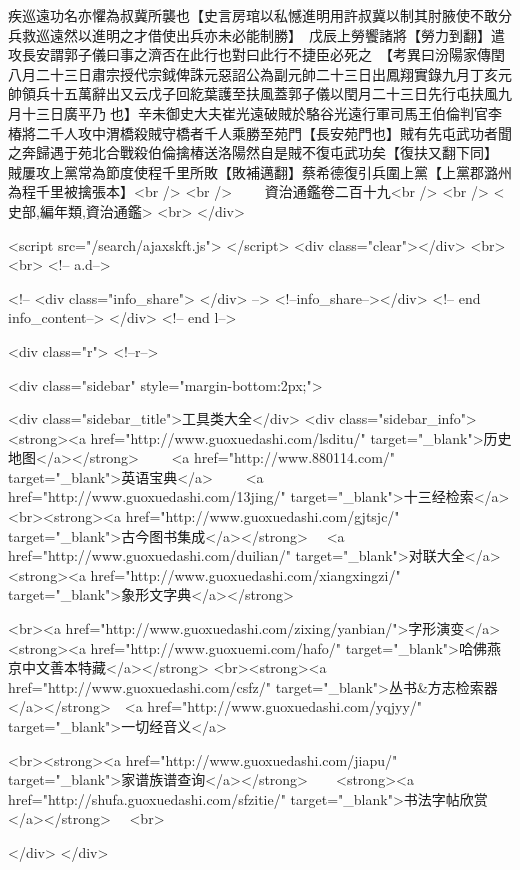疾巡遠功名亦懼為叔冀所襲也【史言房琯以私憾進明用許叔冀以制其肘腋使不敢分兵救巡遠然以進明之才借使出兵亦未必能制勝】　戊辰上勞饗諸將【勞力到翻】遣攻長安謂郭子儀曰事之濟否在此行也對曰此行不捷臣必死之　【考異曰汾陽家傳閏八月二十三日肅宗授代宗鉞俾誅元惡詔公為副元帥二十三日出鳳翔實錄九月丁亥元帥領兵十五萬辭出又云戊子回紇葉護至扶風蓋郭子儀以閏月二十三日先行屯扶風九月十三日廣平乃也】辛未御史大夫崔光遠破賊於駱谷光遠行軍司馬王伯倫判官李椿將二千人攻中渭橋殺賊守橋者千人乘勝至苑門【長安苑門也】賊有先屯武功者聞之奔歸遇于苑北合戰殺伯倫擒椿送洛陽然自是賊不復屯武功矣【復扶又翻下同】　賊屢攻上黨常為節度使程千里所敗【敗補邁翻】蔡希德復引兵圍上黨【上黨郡潞州為程千里被擒張本】<br />
<br />
　　資治通鑑卷二百十九<br />
<br />
<史部,編年類,資治通鑑>  <br>
   </div> 

<script src="/search/ajaxskft.js"> </script>
 <div class="clear"></div>
<br>
<br>
 <!-- a.d-->

 <!--
<div class="info_share">
</div> 
-->
 <!--info_share--></div>   <!-- end info_content-->
  </div> <!-- end l-->

<div class="r">   <!--r-->



<div class="sidebar"  style="margin-bottom:2px;">

 
<div class="sidebar_title">工具类大全</div>
<div class="sidebar_info">
<strong><a href="http://www.guoxuedashi.com/lsditu/" target="_blank">历史地图</a></strong>　　
<a href="http://www.880114.com/" target="_blank">英语宝典</a>　　
<a href="http://www.guoxuedashi.com/13jing/" target="_blank">十三经检索</a>　
<br><strong><a href="http://www.guoxuedashi.com/gjtsjc/" target="_blank">古今图书集成</a></strong>　
<a href="http://www.guoxuedashi.com/duilian/" target="_blank">对联大全</a>　<strong><a href="http://www.guoxuedashi.com/xiangxingzi/" target="_blank">象形文字典</a></strong>　

<br><a href="http://www.guoxuedashi.com/zixing/yanbian/">字形演变</a>　　<strong><a href="http://www.guoxuemi.com/hafo/" target="_blank">哈佛燕京中文善本特藏</a></strong>
<br><strong><a href="http://www.guoxuedashi.com/csfz/" target="_blank">丛书&方志检索器</a></strong>　<a href="http://www.guoxuedashi.com/yqjyy/" target="_blank">一切经音义</a>　　

<br><strong><a href="http://www.guoxuedashi.com/jiapu/" target="_blank">家谱族谱查询</a></strong>　　<strong><a href="http://shufa.guoxuedashi.com/sfzitie/" target="_blank">书法字帖欣赏</a></strong>　
<br>

</div>
</div>


